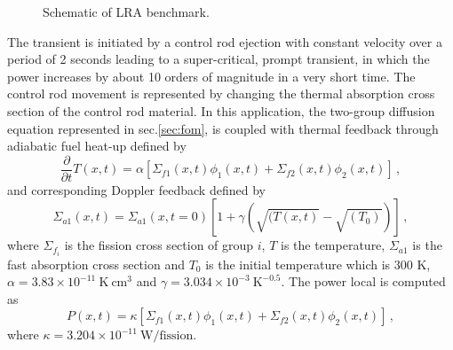 \documentclass[]{interact}
\theoremstyle{plain}%
\theoremstyle{definition}
\theoremstyle{remark}
\begin{document}
\begin{figure}[h!]
	\caption{Schematic of LRA benchmark.}
	\label{fig:lra core}
\end{figure}
The transient is initiated by a control rod ejection with constant velocity over a period of 2 seconds leading to a super-critical, prompt transient, in which the power increases by about 10 orders of magnitude in a very short time.
The control rod movement is represented by changing the thermal absorption cross section of the control rod material.
In this application, the two-group diffusion equation represented in sec.\ref{sec:fom}, is coupled with thermal feedback through adiabatic fuel heat-up defined by
\begin{equation}
	\frac{\partial}{\partial t}T(x,t) = \alpha[\Sigma_{f1}(x,t)\phi_1(x,t)+\Sigma_{f2}(x,t)\phi_2(x,t)] \, ,
	\label{eq:heatup}
\end{equation}
and corresponding Doppler feedback defined by
\begin{equation}
	\Sigma_{a1}(x,t) = \Sigma_{a1}(x,t=0)[1+\gamma(\sqrt{(T(x,t)}-\sqrt{(T_0)})] \, ,
	\label{eq:doppler}
\end{equation}
where $\Sigma_{f_i}$ is the fission cross section of group $i$, $T$ is the temperature, $\Sigma_{a1}$ is the fast absorption cross section and $T_0$ is the initial temperature which is $300 $ K,
$\alpha = 3.83\times 10^{-11}~\text{K}~\text{cm}^3$ and $\gamma = 3.034\times 10^{-3} ~\text{K}^{-0.5}$.
The power local is computed as
\begin{equation}
	P(x,t)=\kappa [\Sigma_{f1}(x,t)\phi_1(x,t)+\Sigma_{f2}(x,t)\phi_2(x,t)] \, ,
\end{equation}
where $\kappa = 3.204\times 10^{-11}~ \text{W/fission}$.
\end{document}
